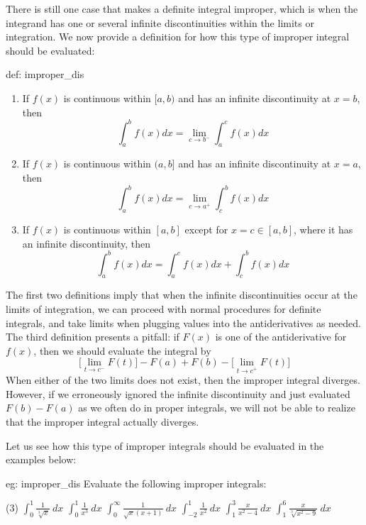 There is still one case that makes a definite integral improper, which is when the integrand has one or several infinite discontinuities within the limits or integration.  We now provide a definition for how this type of improper integral should be evaluated:

\pagebreak

\begin{defi}{def: improper_dis}
    \begin{enumerate}
        \item If $f(x)$ is continuous within $[a, b)$ and has an infinite discontinuity at $x = b$, then
        \[\int_a^b f(x)dx = \lim_{c \rightarrow b^-} \int_a^c f(x)dx\]
        \item If $f(x)$ is continuous within $(a, b]$ and has an infinite discontinuity at $x = a$, then
        \[\int_a^b f(x)dx = \lim_{c \rightarrow a^+} \int_c^b f(x)dx\]
        \item If $f(x)$ is continuous within $[a, b]$ except for $x = c \in [a, b]$, where it has an infinite discontinuity, then
        \[\int_a^b f(x)dx = \int_a^c f(x)dx + \int_c^b f(x)dx\]
    \end{enumerate}
\end{defi}

The first two definitions imply that when the infinite discontinuities occur at the limits of integration, we can proceed with normal procedures for definite integrals, and take limits when plugging values into the antiderivatives as needed.  The third definition presents a pitfall: if $F(x)$ is one of the antiderivative for $f(x)$, then we should evaluate the integral by
\[\big[\lim_{t \rightarrow c^-} F(t)\big] - F(a) + F(b) - \big[\lim_{t \rightarrow c^+} F(t)\big]\]
When either of the two limits does not exist, then the improper integral diverges.  However, if we erroneously ignored the infinite discontinuity and just evaluated $F(b)-F(a)$ as we often do in proper integrals, we will not be able to realize that the improper integral actually diverges. 

Let us see how this type of improper integrals should be evaluated in the examples below:

\begin{eg}[]{eg: improper_dis}
    Evaluate the following improper integrals:
    \begin{tasks}(3)
        \task $\int_0^1 \frac{1}{\sqrt[3]{x}}~dx$
        \task $\int_0^1 \frac{1}{x^3}~dx$
        \task $\int_{0}^{\infty} \frac{1}{\sqrt{x}(x+1)}~dx$
        \task $\int_{-2}^1 \frac{1}{x^2}~dx$
        \task $\int_1^3 \frac{x}{x^2-4}~dx$
        \task $\int_1^6 \frac{x}{\sqrt[3]{x^2-9}}~dx$
    \end{tasks}
\end{eg}

